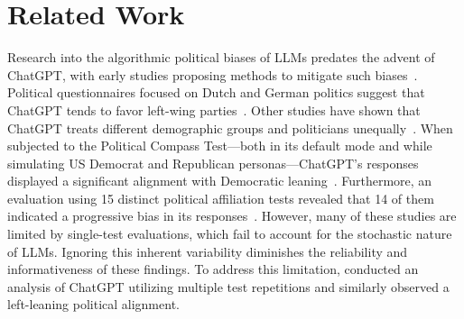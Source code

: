 \documentclass[
	fontsize=10pt,          %
	numbers=noenddot,    	%
    parskip=half,        	%
    listof=totoc,        	%
    bibliography=totoc,  	%
	headsepline=true,       %
	footsepline=false, 		%
    DIV=12                	%
]{scrartcl}
\begin{document}
\section{Related Work}
Research into the algorithmic political biases of LLMs predates the advent of ChatGPT, with early studies proposing methods to mitigate such biases~\cite{aibias, liu2022quantifying}.
Political questionnaires focused on Dutch and German politics suggest that ChatGPT tends to favor left-wing parties~\cite{van2023chatgpt, hartmann2023political}.
Other studies have shown that ChatGPT treats different demographic groups and politicians unequally~\cite{mcgee2023chat, rozado2023danger, mcgee2023were}.
When subjected to the Political Compass Test---both in its default mode and while simulating US Democrat and Republican personas---ChatGPT's responses displayed a significant alignment with Democratic leaning~\cite{motoki2023more}.
Furthermore, an evaluation using 15 distinct political affiliation tests revealed that 14 of them indicated a progressive bias in its responses~\cite{rozado2023political}.
However, many of these studies are limited by single-test evaluations, which fail to account for the stochastic nature of LLMs.
Ignoring this inherent variability diminishes the reliability and informativeness of these findings.
To address this limitation, \cite{rutinowski2024self} conducted an analysis of ChatGPT utilizing multiple test repetitions and similarly observed a left-leaning political alignment.
\end{document}
